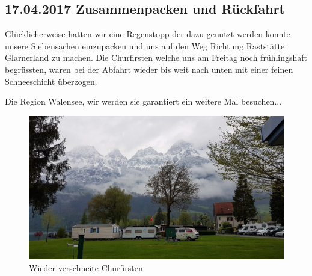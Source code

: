 \subsection{17.04.2017 Zusammenpacken und Rückfahrt}
Glücklicherweise hatten wir eine Regenstopp der dazu genutzt werden konnte unsere Siebensachen einzupacken und uns auf den Weg Richtung Raststätte Glarnerland zu machen.
Die Churfirsten welche uns am Freitag noch frühlingshaft begrüssten, waren bei der Abfahrt wieder bis weit nach unten mit einer feinen Schneeschicht überzogen.

Die Region Walensee, wir werden sie garantiert ein weitere Mal besuchen...

\begin{figure}[H]
    \centering
    \includegraphics[width=\textwidth]{../Bilder/Walensee/35.jpg}
    \caption{Wieder verschneite Churfirsten}
    \label{img:Churfirsten}
\end{figure}
